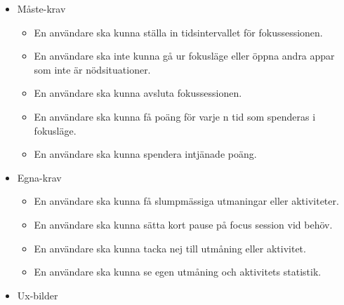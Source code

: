 \documentclass[11pt]{article}
\begin{document}
\begin{itemize}
\item Måste-krav
\begin{itemize}
\item En användare ska kunna ställa in tidsintervallet för fokussessionen.
\item En användare ska inte kunna gå ur fokusläge eller öppna andra appar som inte är nödsituationer.
\item En användare ska kunna avsluta fokussessionen.
\item En användare ska kunna få poäng för varje n tid som spenderas i fokusläge.
\item En användare ska kunna spendera intjänade poäng.
\end{itemize}

\item Egna-krav
\begin{itemize}
\item En användare ska kunna få slumpmässiga utmaningar eller aktiviteter.
\item En användare ska kunna sätta kort pause på focus session vid behöv.
\item En användare ska kunna tacka nej till utmåning eller aktivitet.
\item En användare ska kunna se egen utmåning och aktivitets statistik.
\end{itemize}

\item Ux-bilder
\end{itemize}
\end{document}
